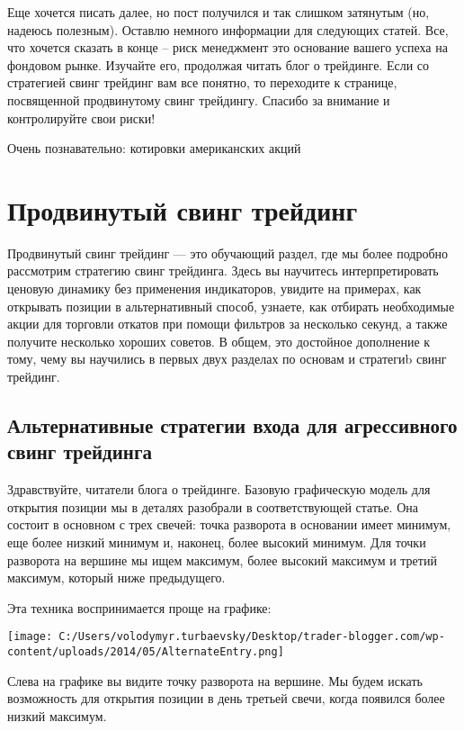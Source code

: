 \documentclass[a5paper]{article}
\begin{document}
Еще хочется писать далее, но пост получился и так слишком затянутым (но, надеюсь полезным). Оставлю немного информации для следующих статей. Все, что хочется сказать в конце – риск менеджмент это основание вашего успеха на фондовом рынке. Изучайте его, продолжая читать блог о трейдинге. Если со стратегией свинг трейдинг вам все понятно, то переходите к странице, посвященной продвинутому свинг трейдингу. Спасибо за внимание и контролируйте свои риски!


Очень познавательно: котировки американских акций


\section{Продвинутый свинг трейдинг}

Продвинутый свинг трейдинг — это обучающий раздел, где мы более
подробно рассмотрим стратегию свинг трейдинга. Здесь вы научитесь
интерпретировать ценовую динамику без применения индикаторов, увидите
на примерах, как открывать позиции в альтернативный способ, узнаете,
как отбирать необходимые акции для торговли откатов при помощи
фильтров за несколько секунд, а также получите несколько хороших
советов. В общем, это достойное дополнение к тому, чему вы научились в
первых двух разделах по основам и стратегиb свинг трейдинг.

\subsection{Альтернативные стратегии входа для агрессивного свинг
  трейдинга}

Здравствуйте, читатели блога о трейдинге. Базовую графическую модель для открытия позиции мы в деталях разобрали в соответствующей статье. Она состоит в основном с трех свечей: точка разворота в основании имеет минимум, еще более низкий минимум и, наконец, более высокий минимум. Для точки разворота на вершине мы ищем максимум, более высокий максимум и третий максимум, который ниже предыдущего.

Эта техника воспринимается проще на графике:

\texttt{[image: C:/Users/volodymyr.turbaevsky/Desktop/trader-blogger.com/wp-content/uploads/2014/05/AlternateEntry.png]}

Слева на графике вы видите точку разворота на вершине. Мы будем искать возможность для открытия позиции в день третьей свечи, когда появился более низкий максимум.
\end{document}
